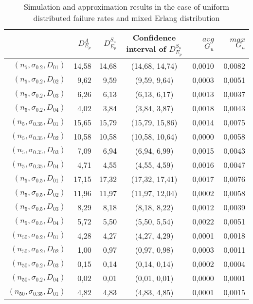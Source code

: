 \documentclass[preprint,12pt]{elsarticle}
\begin{document}
\begin{table}[htbp]
  \centering
  \caption{Simulation and approximation results in the case of uniform distributed failure rates and mixed Erlang distribution}
 \begin{tabular}{rrrcrr}
    \toprule
& $D_{E_{p}}^{A}$ & $D_{E_{p}}^{S_{u}}$ & Confidence interval of $D_{E_{p}}^{S_{u}}$ & $avg$ $G_{u}$ & $max$ $G_{u}$ \\
    \midrule
 $(n_{5},\sigma_{0.2},D_{01})$ & 14,58 & 14,68 & (14,68, 14,74) & 0,0010 & 0,0082 \\
 $(n_{5},\sigma_{0.2},D_{02})$& 9,62  & 9,59  & (9,59, 9,64) & 0,0003 & 0,0051 \\
 $(n_{5},\sigma_{0.2},D_{03})$ & 6,26  & 6,13  & (6,13, 6,17) & 0,0013 & 0,0037 \\
 $(n_{5},\sigma_{0.2},D_{04})$& 4,02  & 3,84  & (3,84, 3,87) & 0,0018 & 0,0043 \\
 $(n_{5},\sigma_{0.35},D_{01})$ & 15,65 & 15,79 & (15,79, 15,86) & 0,0014 & 0,0075 \\
 $(n_{5},\sigma_{0.35},D_{02})$& 10,58 & 10,58 & (10,58, 10,64) & 0,0000 & 0,0058 \\
 $(n_{5},\sigma_{0.35},D_{03})$ & 7,09  & 6,94  & (6,94, 6,99) & 0,0015 & 0,0043 \\
 $(n_{5},\sigma_{0.35},D_{04})$ & 4,71  & 4,55  & (4,55, 4,59) & 0,0016 & 0,0047 \\
 $(n_{5},\sigma_{0.5},D_{01})$  & 17,15 & 17,32 & (17,32, 17,41) & 0,0017 & 0,0076 \\
 $(n_{5},\sigma_{0.5},D_{02})$ & 11,96 & 11,97 & (11,97, 12,04) & 0,0002 & 0,0058 \\
 $(n_{5},\sigma_{0.5},D_{03})$  & 8,29  & 8,18  & (8,18, 8,22) & 0,0012 & 0,0039 \\
 $(n_{5},\sigma_{0.5},D_{04})$ & 5,72  & 5,50  & (5,50, 5,54) & 0,0022 & 0,0051 \\
 $(n_{50},\sigma_{0.2},D_{01})$  & 4,28  & 4,27  & (4,27, 4,29) & 0,0001 & 0,0018 \\
 $(n_{50},\sigma_{0.2},D_{02})$  & 1,00  & 0,97  & (0,97, 0,98) & 0,0003 & 0,0011 \\
 $(n_{50},\sigma_{0.2},D_{03})$ & 0,15  & 0,14  & (0,14, 0,14) & 0,0002 & 0,0004 \\
 $(n_{50},\sigma_{0.2},D_{04})$  & 0,02  & 0,01  & (0,01, 0,01) & 0,0000 & 0,0001 \\
 $(n_{50},\sigma_{0.35},D_{01})$& 4,82  & 4,83  & (4,83, 4,85) & 0,0001 & 0,0015 \\

\end{tabular}
\end{table}
\end{document}
